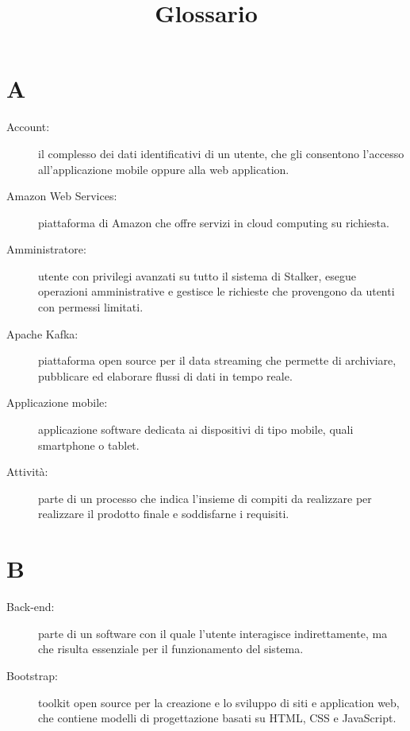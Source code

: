 \documentclass{article}
\title{Glossario}
\begin{document}


	\section{A}
	\begin{description}
		\item[Account:] il complesso dei dati identificativi di un utente, che gli consentono l'accesso all'applicazione mobile oppure alla web application.
		\item[Amazon Web Services:] piattaforma di Amazon che offre servizi in cloud computing su richiesta.
		\item[Amministratore:] utente con privilegi avanzati su tutto il sistema di Stalker, esegue operazioni amministrative e gestisce le richieste che provengono da utenti con permessi limitati.
		\item[Apache Kafka:] piattaforma open source per il data streaming che permette di archiviare, pubblicare ed elaborare flussi di dati in tempo reale.
		\item[Applicazione mobile:] applicazione software dedicata ai dispositivi di tipo mobile, quali smartphone o tablet. 
		\item[Attività:] parte di un processo che indica l'insieme di compiti da realizzare per realizzare il prodotto finale e soddisfarne i requisiti.
	\end{description}
	\newpage
	\section{B}
	\begin{description}
		\item[Back-end:] parte di un software con il quale l'utente interagisce indirettamente, ma che risulta essenziale per il funzionamento del sistema.
		\item[Bootstrap:] toolkit open source per la creazione e lo sviluppo di siti e application web, che contiene modelli di progettazione basati su HTML, CSS e JavaScript.
	\end{description}
	\newpage
\end{document}
